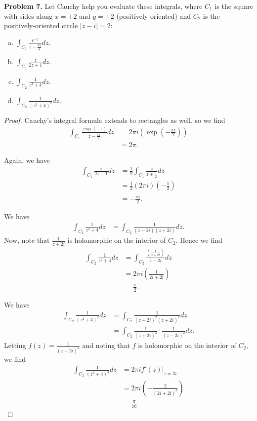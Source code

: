 \documentclass[leqno]{article}
\theoremstyle{nonumberplain}
\newtheorem{proof}{Proof}
\begin{document}
\vspace*{1cm}

\noindent\textbf{Problem 7.}  Let Cauchy help you evaluate these integrals, where $C_1$ is the square with sides along $x=\pm 2$ and $y=\pm 2$ (positively oriented) and $C_2$ is the positively-oriented circle $|z-i|= 2$:

\begin{enumerate}[(a)]
\item $\int_{C_1} \frac{e^{-z}}{z-\frac{\pi i}{2}} dz$.
\item $\int_{C_1} \frac{z}{2z+1}dz$.
\item $\int_{C_2} \frac{1}{z^2+4}dz$.
\item $\int_{C_2} \frac{1}{(z^2+4)^2}dz$.
\end{enumerate}

\begin{proof}
\item Cauchy's integral formula extends to rectangles as well, so we find
\begin{align*}
\int_{C_1} \frac{\exp(-z)}{z-\frac{\pi i}{2}}dz &= 2\pi i \left(\exp\left( -\frac{\pi i}{2} \right)\right)\\
&= 2\pi.
\end{align*}
\item Again, we have
\begin{align*}
\int_{C_1}\frac{z}{2z+1}dz &= \frac{1}{2} \int_{C_1} \frac{z}{z+\frac{1}{2}}dz\\
&= \frac{1}{2}(2\pi i)\left(-\frac{1}{2}\right)\\
&= -\frac{\pi i}{2}.
\end{align*}
\item We have
\begin{align*}
\int_{C_2}\frac{1}{z^2+4}dz&= \int_{C_2} \frac{1}{(z-2i)(z+2i)}dz.
\end{align*}
Now, note that $\displaystyle{\frac{1}{z+2i}}$ is holomorphic on the interior of $C_2$. Hence we find
\begin{align*}
\int_{C_2} \frac{1}{z^2+4}dz&= \int_{C_2} \frac{\left(\frac{1}{z+2i}\right)}{z-2i}dz\\
&= 2\pi i \left( \frac{1}{2i+2i}\right)\\
&= \frac{\pi}{2}.
\end{align*}
\item We have
\begin{align*}
\int_{C_2}\frac{1}{(z^2+4)^2}dz&=\int_{C_2}\frac{1}{(z-2i)^2(z+2i)^2}dz\\
&=\int_{C_2}\frac{1}{(z+2i)^2}\cdot \frac{1}{(z-2i)^2}dz.
\end{align*}
Letting $f(z)=\frac{1}{(z+2i)^2}$ and noting that $f$ is holomorphic on the interior of $C_2$, we find
\begin{align*}
\int_{C_2} \frac{1}{(z^2+4)^2}dz&=2\pi i f'(z) \vert_{z=2i}\\
&=2\pi i \left( - \frac{2}{(2i+2i)^3}\right)\\
&= \frac{\pi}{16}.
\end{align*}
\end{proof}
\end{document}

